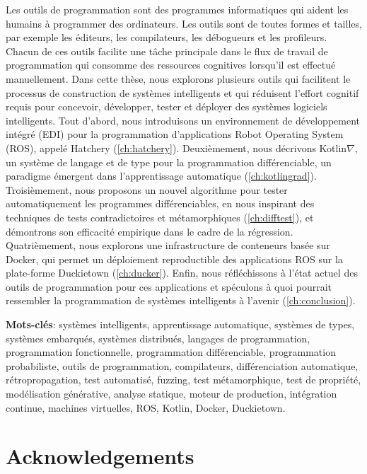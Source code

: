 \vspace{-40pt} Les outils de programmation sont des programmes informatiques qui aident les humains \`a programmer des ordinateurs. Les outils sont de toutes formes et tailles, par exemple les \'editeurs, les compilateurs, les d\'ebogueurs et les profileurs. Chacun de ces outils facilite une t\^ache principale dans le flux de travail de programmation qui consomme des ressources cognitives lorsqu'il est effectu\'e manuellement. Dans cette th\`ese, nous explorons plusieurs outils qui facilitent le processus de construction de syst\`emes intelligents et qui r\'eduisent l'effort cognitif requis pour concevoir, d\'evelopper, tester et d\'eployer des syst\`emes logiciels intelligents. Tout d'abord, nous introduisons un environnement de d\'eveloppement int\'egr\'e (EDI) pour la programmation d'applications Robot Operating System (ROS), appel\'e Hatchery (\autoref{ch:hatchery}). Deuxi\`emement, nous d\'ecrivons Kotlin$\nabla$, un syst\`eme de langage et de type pour la programmation diff\'erenciable, un paradigme \'emergent dans l'apprentissage automatique (\autoref{ch:kotlingrad}). Troisi\`emement, nous proposons un nouvel algorithme pour tester automatiquement les programmes diff\'erenciables, en nous inspirant des techniques de tests contradictoires et m\'etamorphiques (\autoref{ch:difftest}), et d\'emontrons son efficacit\'e empirique dans le cadre de la r\'egression. Quatri\`emement, nous explorons une infrastructure de conteneurs bas\'ee sur Docker, qui permet un d\'eploiement reproductible des applications ROS sur la plate-forme Duckietown (\autoref{ch:ducker}). Enfin, nous r\'efl\'echissons \`a l'\'etat actuel des outils de programmation pour ces applications et sp\'eculons \`a quoi pourrait ressembler la programmation de syst\`emes intelligents \`a l'avenir (\autoref{ch:conclusion}).

\noindent\textbf{Mots-cl\'es}: syst\`emes intelligents, apprentissage automatique, syst\`emes de types, syst\`emes embarqu\'es, syst\`emes distribu\'es, langages de programmation, programmation fonctionnelle, programmation diff\'erenciable, programmation probabiliste, outils de programmation, compilateurs, diff\'erenciation automatique, r\'etropropagation, test automatis\'e, fuzzing, test m\'etamorphique, test de propri\'et\'e, mod\'elisation g\'en\'erative, analyse statique, moteur de production, int\'egration continue, machines virtuelles, ROS, Kotlin, Docker, Duckietown.

\chapter*{Acknowledgements}

